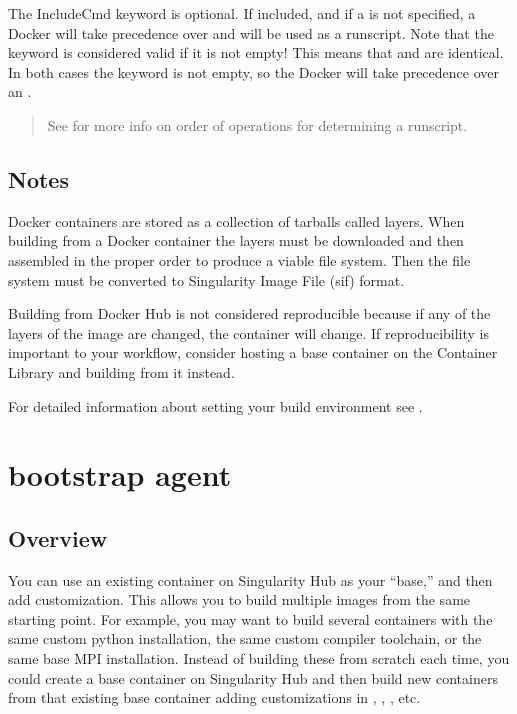 \documentclass[letterpaper,10pt,english]{sphinxmanual}
\begin{document}
The IncludeCmd keyword is optional. If included, and if a  is not
specified, a Docker  will take precedence over  and will be
used as a runscript. Note that the  keyword is considered valid if
it is not empty! This means that  and  are
identical. In both cases the  keyword is not empty, so the Docker
 will take precedence over an .
\begin{quote}

See  for more info on
order of operations for determining a runscript.
\end{quote}


\subsection{Notes}
\label{\detokenize{appendix:notes}}
Docker containers are stored as a collection of tarballs called layers. When
building from a Docker container the layers must be downloaded and then
assembled in the proper order to produce a viable file system. Then the file
system must be converted to Singularity Image File (sif) format.

Building from Docker Hub is not considered reproducible because if any of the
layers of the image are changed, the container will change. If reproducibility
is important to your workflow, consider hosting a base container on the
Container Library and building from it instead.

For detailed information about setting your build environment see
.


\section{ bootstrap agent}
\label{\detokenize{appendix:shub-bootstrap-agent}}\label{\detokenize{appendix:build-shub}}

\subsection{Overview}
\label{\detokenize{appendix:sec-build-shub}}\label{\detokenize{appendix:id3}}
You can use an existing container on Singularity Hub as your “base,” and then
add customization. This allows you to build multiple images from the same
starting point. For example, you may want to build several containers with the
same custom python installation, the same custom compiler toolchain, or the same
base MPI installation. Instead of building these from scratch each time, you
could create a base container on Singularity Hub and then build new containers
from that existing base container adding customizations in  ,
, , etc.
\end{document}
